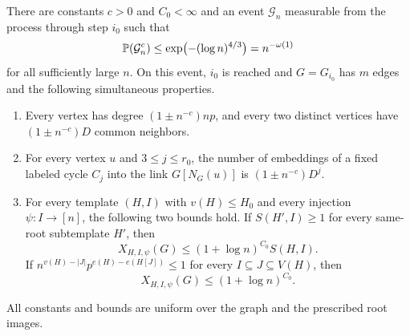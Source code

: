\begin{proposition}\label{prop:prefix}
There are constants $c>0$ and $C_0<\infty$ and an event $\mathcal G_n$
measurable from the process through step $i_0$ such that
\[
 \mathbb P(\mathcal G_n^c)\le
       \exp\bigl(- (\log n)^{4/3}\bigr)=n^{-\omega(1)}
\]
for all sufficiently large $n$. On this event, $i_0$ is reached and
$G=G_{i_0}$ has $m$ edges and the following simultaneous properties.
\begin{enumerate}[label=\textup{(\roman*)}]
\item\label{it:degrees}
Every vertex has degree $(1\pm n^{-c})np$, and every two distinct
vertices have $(1\pm n^{-c})D$ common neighbors.
\item\label{it:cycles}
For every vertex $u$ and $3\le j\le r_0$, the number of embeddings of a
fixed labeled cycle $C_j$ into the link $G[N_G(u)]$ is
$(1\pm n^{-c})D^j$.
\item\label{it:templates}
For every template $(H,I)$ with $v(H)\le H_0$ and every injection
$\psi:I\to[n]$, the following two bounds hold.
If $S(H',I)\ge1$ for every same-root subtemplate $H'$, then
\begin{equation}\label{eq:template-large}
 X_{H,I,\psi}(G)\le(1+\log n)^{C_0}S(H,I).
\end{equation}
If $n^{v(H)-|J|}p^{e(H)-e(H[J])}\le1$ for every
$I\subseteq J\subseteq V(H)$, then
\begin{equation}\label{eq:template-small}
 X_{H,I,\psi}(G)\le(1+\log n)^{C_0}.
\end{equation}
\end{enumerate}
All constants and bounds are uniform over the graph and the prescribed
root images.
\end{proposition}


